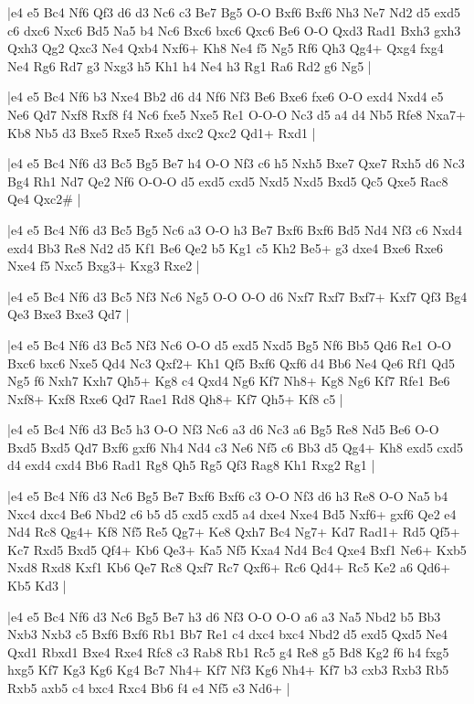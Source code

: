 \whitename{}
\blackname{}
\makegametitle
|e4 e5 Bc4 Nf6 Qf3 d6 d3 Nc6 c3 Be7 Bg5 O-O Bxf6 Bxf6 Nh3 Ne7 Nd2 d5 exd5 c6 dxc6 Nxc6 Bd5 Na5 b4 Nc6 Bxc6 bxc6 Qxc6 Be6 O-O Qxd3 Rad1 Bxh3 gxh3 Qxh3 Qg2 Qxc3 Ne4 Qxb4 Nxf6+ Kh8 Ne4 f5 Ng5 Rf6 Qh3 Qg4+ Qxg4 fxg4 Ne4 Rg6 Rd7 g3 Nxg3 h5 Kh1 h4 Ne4 h3 Rg1 Ra6 Rd2 g6 Ng5  |

\whitename{}
\blackname{}
\makegametitle
|e4 e5 Bc4 Nf6 b3 Nxe4 Bb2 d6 d4 Nf6 Nf3 Be6 Bxe6 fxe6 O-O exd4 Nxd4 e5 Ne6 Qd7 Nxf8 Rxf8 f4 Nc6 fxe5 Nxe5 Re1 O-O-O Nc3 d5 a4 d4 Nb5 Rfe8 Nxa7+ Kb8 Nb5 d3 Bxe5 Rxe5 Rxe5 dxc2 Qxc2 Qd1+ Rxd1  |

\whitename{}
\blackname{}
\makegametitle
|e4 e5 Bc4 Nf6 d3 Bc5 Bg5 Be7 h4 O-O Nf3 c6 h5 Nxh5 Bxe7 Qxe7 Rxh5 d6 Nc3 Bg4 Rh1 Nd7 Qe2 Nf6 O-O-O d5 exd5 cxd5 Nxd5 Nxd5 Bxd5 Qc5 Qxe5 Rac8 Qe4 Qxc2\#  |

\whitename{}
\blackname{}
\makegametitle
|e4 e5 Bc4 Nf6 d3 Bc5 Bg5 Nc6 a3 O-O h3 Be7 Bxf6 Bxf6 Bd5 Nd4 Nf3 c6 Nxd4 exd4 Bb3 Re8 Nd2 d5 Kf1 Be6 Qe2 b5 Kg1 c5 Kh2 Be5+ g3 dxe4 Bxe6 Rxe6 Nxe4 f5 Nxc5 Bxg3+ Kxg3 Rxe2  |

\whitename{}
\blackname{}
\makegametitle
|e4 e5 Bc4 Nf6 d3 Bc5 Nf3 Nc6 Ng5 O-O O-O d6 Nxf7 Rxf7 Bxf7+ Kxf7 Qf3 Bg4 Qe3 Bxe3 Bxe3 Qd7  |

\whitename{}
\blackname{}
\makegametitle
|e4 e5 Bc4 Nf6 d3 Bc5 Nf3 Nc6 O-O d5 exd5 Nxd5 Bg5 Nf6 Bb5 Qd6 Re1 O-O Bxc6 bxc6 Nxe5 Qd4 Nc3 Qxf2+ Kh1 Qf5 Bxf6 Qxf6 d4 Bb6 Ne4 Qe6 Rf1 Qd5 Ng5 f6 Nxh7 Kxh7 Qh5+ Kg8 c4 Qxd4 Ng6 Kf7 Nh8+ Kg8 Ng6 Kf7 Rfe1 Be6 Nxf8+ Kxf8 Rxe6 Qd7 Rae1 Rd8 Qh8+ Kf7 Qh5+ Kf8 c5  |

\whitename{}
\blackname{}
\makegametitle
|e4 e5 Bc4 Nf6 d3 Bc5 h3 O-O Nf3 Nc6 a3 d6 Nc3 a6 Bg5 Re8 Nd5 Be6 O-O Bxd5 Bxd5 Qd7 Bxf6 gxf6 Nh4 Nd4 c3 Ne6 Nf5 c6 Bb3 d5 Qg4+ Kh8 exd5 cxd5 d4 exd4 cxd4 Bb6 Rad1 Rg8 Qh5 Rg5 Qf3 Rag8 Kh1 Rxg2 Rg1  |

\whitename{}
\blackname{}
\makegametitle
|e4 e5 Bc4 Nf6 d3 Nc6 Bg5 Be7 Bxf6 Bxf6 c3 O-O Nf3 d6 h3 Re8 O-O Na5 b4 Nxc4 dxc4 Be6 Nbd2 c6 b5 d5 cxd5 cxd5 a4 dxe4 Nxe4 Bd5 Nxf6+ gxf6 Qe2 e4 Nd4 Rc8 Qg4+ Kf8 Nf5 Re5 Qg7+ Ke8 Qxh7 Bc4 Ng7+ Kd7 Rad1+ Rd5 Qf5+ Kc7 Rxd5 Bxd5 Qf4+ Kb6 Qe3+ Ka5 Nf5 Kxa4 Nd4 Bc4 Qxe4 Bxf1 Ne6+ Kxb5 Nxd8 Rxd8 Kxf1 Kb6 Qe7 Rc8 Qxf7 Rc7 Qxf6+ Rc6 Qd4+ Rc5 Ke2 a6 Qd6+ Kb5 Kd3  |

\whitename{}
\blackname{}
\makegametitle
|e4 e5 Bc4 Nf6 d3 Nc6 Bg5 Be7 h3 d6 Nf3 O-O O-O a6 a3 Na5 Nbd2 b5 Bb3 Nxb3 Nxb3 c5 Bxf6 Bxf6 Rb1 Bb7 Re1 c4 dxc4 bxc4 Nbd2 d5 exd5 Qxd5 Ne4 Qxd1 Rbxd1 Bxe4 Rxe4 Rfc8 c3 Rab8 Rb1 Rc5 g4 Re8 g5 Bd8 Kg2 f6 h4 fxg5 hxg5 Kf7 Kg3 Kg6 Kg4 Bc7 Nh4+ Kf7 Nf3 Kg6 Nh4+ Kf7 b3 cxb3 Rxb3 Rb5 Rxb5 axb5 c4 bxc4 Rxc4 Bb6 f4 e4 Nf5 e3 Nd6+  |

